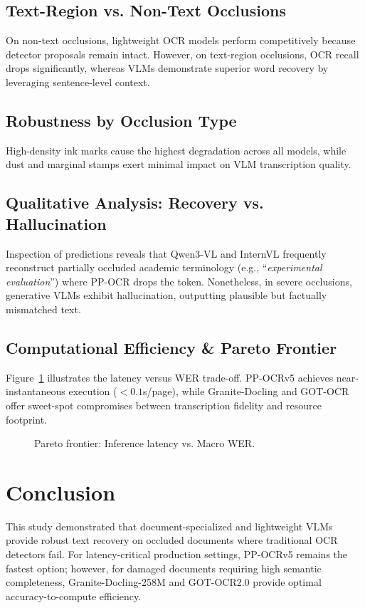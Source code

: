 \documentclass[10pt,twocolumn,a4paper]{article}
\begin{document}
\subsection{Text-Region vs. Non-Text Occlusions}
On non-text occlusions, lightweight OCR models perform competitively because detector proposals remain intact. However, on text-region occlusions, OCR recall drops significantly, whereas VLMs demonstrate superior word recovery by leveraging sentence-level context.

\subsection{Robustness by Occlusion Type}
High-density ink marks cause the highest degradation across all models, while dust and marginal stamps exert minimal impact on VLM transcription quality.

\subsection{Qualitative Analysis: Recovery vs. Hallucination}
Inspection of predictions reveals that Qwen3-VL and InternVL frequently reconstruct partially occluded academic terminology (e.g., ``\textit{experimental evaluation}'') where PP-OCR drops the token. Nonetheless, in severe occlusions, generative VLMs exhibit hallucination, outputting plausible but factually mismatched text.

\subsection{Computational Efficiency \& Pareto Frontier}
Figure~\ref{fig:pareto} illustrates the latency versus WER trade-off. PP-OCRv5 achieves near-instantaneous execution ($<0.1$s/page), while Granite-Docling and GOT-OCR offer sweet-spot compromises between transcription fidelity and resource footprint.

\begin{figure}[h]
\centering
\caption{Pareto frontier: Inference latency vs. Macro WER.}
\label{fig:pareto}
\end{figure}

\section{Conclusion}
This study demonstrated that document-specialized and lightweight VLMs provide robust text recovery on occluded documents where traditional OCR detectors fail. For latency-critical production settings, PP-OCRv5 remains the fastest option; however, for damaged documents requiring high semantic completeness, Granite-Docling-258M and GOT-OCR2.0 provide optimal accuracy-to-compute efficiency.
\end{document}
